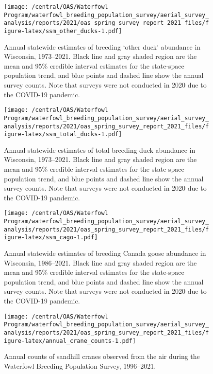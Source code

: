 \documentclass[
  12pt,
]{article}
\begin{document}
\newpage

\begin{figure}
\centering
\texttt{[image: /central/OAS/Waterfowl Program/waterfowl\_breeding\_population\_survey/aerial\_survey\_analysis/reports/2021/oas\_spring\_survey\_report\_2021\_files/figure-latex/ssm\_other\_ducks-1.pdf]}
\caption{\label{fig:ssm_other_ducks}Annual statewide estimates of
breeding `other duck' abundance in Wisconsin, 1973--2021. Black line and
gray shaded region are the mean and 95\% credible interval estimates for
the state-space population trend, and blue points and dashed line show
the annual survey counts. Note that surveys were not conducted in 2020
due to the COVID-19 pandemic.}
\end{figure}

\newpage

\begin{figure}
\centering
\texttt{[image: /central/OAS/Waterfowl Program/waterfowl\_breeding\_population\_survey/aerial\_survey\_analysis/reports/2021/oas\_spring\_survey\_report\_2021\_files/figure-latex/ssm\_total\_ducks-1.pdf]}
\caption{\label{fig:ssm_total_ducks}Annual statewide estimates of total
breeding duck abundance in Wisconsin, 1973--2021. Black line and gray
shaded region are the mean and 95\% credible interval estimates for the
state-space population trend, and blue points and dashed line show the
annual survey counts. Note that surveys were not conducted in 2020 due
to the COVID-19 pandemic.}
\end{figure}

\newpage

\begin{figure}
\centering
\texttt{[image: /central/OAS/Waterfowl Program/waterfowl\_breeding\_population\_survey/aerial\_survey\_analysis/reports/2021/oas\_spring\_survey\_report\_2021\_files/figure-latex/ssm\_cago-1.pdf]}
\caption{\label{fig:ssm_cago}Annual statewide estimates of breeding
Canada goose abundance in Wisconsin, 1986--2021. Black line and gray
shaded region are the mean and 95\% credible interval estimates for the
state-space population trend, and blue points and dashed line show the
annual survey counts. Note that surveys were not conducted in 2020 due
to the COVID-19 pandemic.}
\end{figure}

\newpage

\begin{figure}
\centering
\texttt{[image: /central/OAS/Waterfowl Program/waterfowl\_breeding\_population\_survey/aerial\_survey\_analysis/reports/2021/oas\_spring\_survey\_report\_2021\_files/figure-latex/annual\_crane\_counts-1.pdf]}
\caption{\label{fig:annual_crane_counts}Annual counts of sandhill cranes
observed from the air during the Waterfowl Breeding Population Survey,
1996--2021.}
\end{figure}
\end{document}
